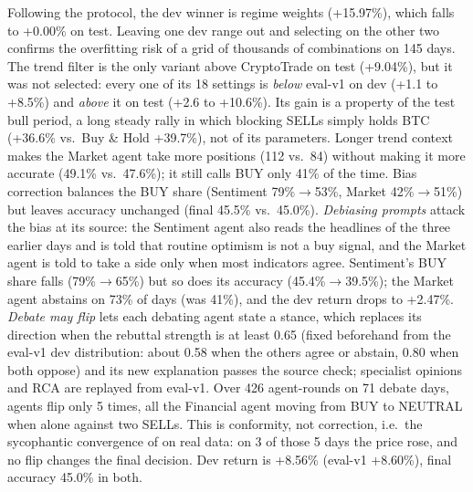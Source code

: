 \documentclass[11pt]{article}
\begin{document}
Following the protocol, the dev winner is regime weights (+15.97\%), which falls to +0.00\% on test. Leaving one dev
range out and selecting on the other two confirms the overfitting risk of a grid of thousands of combinations on 145
days. The trend filter is the only variant above CryptoTrade on test (+9.04\%), but it was not selected: every one of its
18 settings is \emph{below} eval-v1 on dev (+1.1 to +8.5\%) and \emph{above} it on test (+2.6 to +10.6\%). Its gain is a
property of the test bull period, a long steady rally in which blocking SELLs simply holds BTC (+36.6\% vs.\ Buy \& Hold
+39.7\%), not of its parameters. Longer trend context makes the Market agent take more positions (112 vs.\ 84) without
making it more accurate (49.1\% vs.\ 47.6\%); it still calls BUY only 41\% of the time. Bias correction balances the BUY
share (Sentiment 79\%$\rightarrow$53\%, Market 42\%$\rightarrow$51\%) but leaves accuracy unchanged (final 45.5\% vs.\
45.0\%). \emph{Debiasing prompts} attack the bias at its source: the Sentiment agent also reads the headlines of the
three earlier days and is told that routine optimism is not a buy signal, and the Market agent is told to take a side
only when most indicators agree. Sentiment's BUY share falls (79\%$\rightarrow$65\%) but so does its accuracy
(45.4\%$\rightarrow$39.5\%); the Market agent abstains on 73\% of days (was 41\%), and the dev return drops to +2.47\%.
\emph{Debate may flip} lets each debating agent state a stance, which replaces its direction when the rebuttal strength
is at least 0.65 (fixed beforehand from the eval-v1 dev distribution: about 0.58 when the others agree or abstain, 0.80
when both oppose) and its new explanation passes the source check; specialist opinions and RCA are replayed from eval-v1.
Over 426 agent-rounds on 71 debate days, agents flip only 5 times, all the Financial agent moving from BUY to NEUTRAL
when alone against two SELLs. This is conformity, not correction, i.e.\ the sycophantic convergence of
\citet{huang2026debate} on real data: on 3 of those 5 days the price rose, and no flip changes the final decision. Dev return is +8.56\% (eval-v1 +8.60\%), final accuracy 45.0\% in both.
\end{document}
